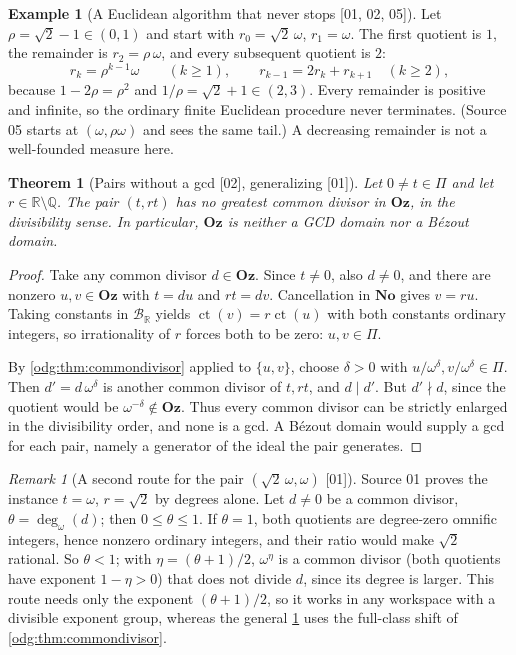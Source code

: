 \documentclass[11pt,oneside]{article}
\numberwithin{equation}{section}
\newtheorem{theorem}{Theorem}[section]
\theoremstyle{definition}
\newtheorem{example}[example]{Example}
\theoremstyle{remark}
\newtheorem{remark}[remark]{Remark}
\newcommand{\No}{\mathbf{No}}
\newcommand{\Oz}{\mathbf{Oz}}
\newcommand{\Q}{\mathbb Q}
\newcommand{\R}{\mathbb R}
\newcommand{\BR}{\mathcal B_{\R}}
\newcommand{\ct}{\operatorname{ct}}
\newcommand{\ddeg}{\operatorname{deg}_{\omega}}
\newcommand{\src}[1]{\textup{\textsf{\small[#1]}}}
\begin{document}
\begin{example}[A Euclidean algorithm that never stops \src{01, 02, 05}]\label{odg:ex:euclid}
Let $\rho=\sqrt2-1\in(0,1)$ and start with $r_0=\sqrt2\,\omega$,
$r_1=\omega$. The first quotient is $1$, the remainder is $r_2=\rho\,\omega$,
and every subsequent quotient is $2$:
\[
 r_k=\rho^{k-1}\omega\qquad(k\geq1),\qquad
 r_{k-1}=2r_k+r_{k+1}\quad(k\ge2),
\]
because $1-2\rho=\rho^2$ and $1/\rho=\sqrt2+1\in(2,3)$. Every remainder is
positive and infinite, so the ordinary finite Euclidean procedure never
terminates. (Source 05 starts at $(\omega,\rho\omega)$ and sees the same tail.)
A decreasing remainder is not a well-founded measure here.
\end{example}

\begin{theorem}[Pairs without a gcd \src{02}, generalizing \src{01}]\label{odg:thm:nogcd}
Let $0\ne t\in\Pi$ and let $r\in\R\setminus\Q$. The pair $(t,rt)$ has no
greatest common divisor in $\Oz$, in the divisibility sense. In particular,
$\Oz$ is neither a GCD domain nor a B\'ezout domain.
\end{theorem}
\begin{proof}
Take any common divisor $d\in\Oz$. Since $t\ne0$, also $d\ne0$, and there
are nonzero $u,v\in\Oz$ with $t=du$ and $rt=dv$. Cancellation in $\No$
gives $v=ru$. Taking constants in $\BR$ yields $\ct(v)=r\ct(u)$ with both
constants ordinary integers, so irrationality of $r$ forces both to be zero:
$u,v\in\Pi$.

By \cref{odg:thm:commondivisor} applied to $\{u,v\}$, choose $\delta>0$
with $u/\omega^\delta,v/\omega^\delta\in\Pi$. Then $d'=d\,\omega^\delta$ is
another common divisor of $t,rt$, and $d\mid d'$. But $d'\nmid d$, since the
quotient would be $\omega^{-\delta}\notin\Oz$. Thus every common divisor can
be strictly enlarged in the divisibility order, and none is a gcd. A
B\'ezout domain would supply a gcd for each pair, namely a generator of the
ideal the pair generates.
\end{proof}

\begin{remark}[A second route for the pair $(\sqrt2\,\omega,\omega)$ \src{01}]\label{odg:rem:nogcd01}\label{odg:prop:nogcd}
Source 01 proves the instance $t=\omega$, $r=\sqrt2$ by degrees alone. Let
$d\ne0$ be a common divisor, $\theta=\ddeg(d)$; then $0\le\theta\le1$. If
$\theta=1$, both quotients are degree-zero omnific integers, hence nonzero
ordinary integers, and their ratio would make $\sqrt2$ rational. So
$\theta<1$; with $\eta=(\theta+1)/2$, $\omega^\eta$ is a common divisor (both
quotients have exponent $1-\eta>0$) that does not divide $d$, since its degree
is larger. This route needs only the exponent $(\theta+1)/2$, so it works in
any workspace with a divisible exponent group, whereas the general
\cref{odg:thm:nogcd} uses the full-class shift of
\cref{odg:thm:commondivisor}.
\end{remark}
\end{document}
